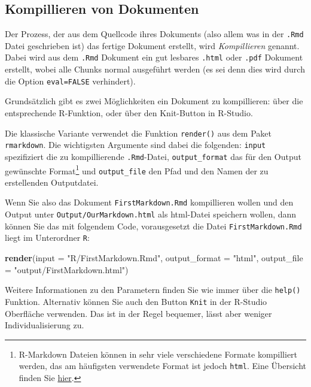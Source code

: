 \documentclass[]{tufte-book}
\newenvironment{Shaded}{}{}
\newcommand{\KeywordTok}[1]{\textcolor[rgb]{0.00,0.44,0.13}{\textbf{#1}}}
\newcommand{\DataTypeTok}[1]{\textcolor[rgb]{0.56,0.13,0.00}{#1}}
\newcommand{\StringTok}[1]{\textcolor[rgb]{0.25,0.44,0.63}{#1}}
\newcommand{\NormalTok}[1]{#1}
\begin{document}
\subsection{Kompillieren von
Dokumenten}\label{kompillieren-von-dokumenten}

Der Prozess, der aus dem Quellcode ihres Dokuments (also allem was in
der \texttt{.Rmd} Datei geschrieben ist) das fertige Dokument erstellt,
wird \emph{Kompillieren} genannt. Dabei wird aus dem \texttt{.Rmd}
Dokument ein gut lesbares \texttt{.html} oder \texttt{.pdf} Dokument
erstellt, wobei alle Chunks normal ausgeführt werden (es sei denn dies
wird durch die Option \texttt{eval=FALSE} verhindert).

Grundsätzlich gibt es zwei Möglichkeiten ein Dokument zu kompillieren:
über die entsprechende R-Funktion, oder über den Knit-Button in
R-Studio.

Die klassische Variante verwendet die Funktion \texttt{render()} aus dem
Paket \texttt{rmarkdown}. Die wichtigsten Argumente sind dabei die
folgenden: \texttt{input} spezifiziert die zu kompillierende
\texttt{.Rmd}-Datei, \texttt{output\_format} das für den Output
gewünschte Format\footnote{R-Markdown Dateien können in sehr viele
  verschiedene Formate kompilliert werden, das am häufigsten verwendete
  Format ist jedoch \texttt{html}. Eine Übersicht finden Sie
  \href{https://bookdown.org/yihui/rmarkdown/output-formats.html}{hier}.}
und \texttt{output\_file} den Pfad und den Namen der zu erstellenden
Outputdatei.

Wenn Sie also das Dokument \texttt{FirstMarkdown.Rmd} kompillieren
wollen und den Output unter \texttt{Output/OurMarkdown.html} als
html-Datei speichern wollen, dann können Sie das mit folgendem Code,
vorausgesetzt die Datei \texttt{FirstMarkdown.Rmd} liegt im Unterordner
\texttt{R}:

\begin{Shaded}
\begin{Highlighting}[]
\KeywordTok{render}\NormalTok{(}\DataTypeTok{input =} \StringTok{"R/FirstMarkdown.Rmd"}\NormalTok{, }\DataTypeTok{output_format =} \StringTok{"html"}\NormalTok{, }
    \DataTypeTok{output_file =} \StringTok{"output/FirstMarkdown.html"}\NormalTok{)}
\end{Highlighting}
\end{Shaded}

Weitere Informationen zu den Parametern finden Sie wie immer über die
\texttt{help()} Funktion. Alternativ können Sie auch den Button
\texttt{Knit} in der R-Studio Oberfläche verwenden. Das ist in der Regel
bequemer, lässt aber weniger Individualisierung zu.
\end{document}
